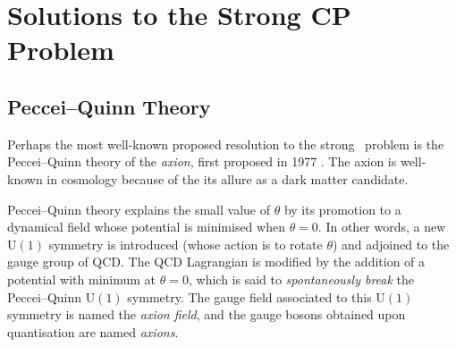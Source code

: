 \chapter{Solutions to the Strong CP Problem}

\section{Peccei--Quinn Theory}

Perhaps the most well-known proposed resolution to the strong \CP\ problem is the Peccei--Quinn theory of the \emph{axion}, first proposed in 1977 \cite{PecceiQuin_1977}.
The axion is well-known in cosmology because of the its allure as a dark matter candidate.

Peccei--Quinn theory explains the small value of $\theta$ by its promotion to a dynamical field whose potential is minimised when $\theta = 0$.
In other words, a new $\mathrm{U}(1)$ symmetry is introduced (whose action is to rotate $\theta$) and adjoined to the gauge group of QCD.
The QCD Lagrangian is modified by the addition of a potential with minimum at $\theta = 0$, which is said to \emph{spontaneously break} the Peccei--Quinn $\mathrm{U}(1)$ symmetry.
The gauge field associated to this $\mathrm{U}(1)$ symmetry is named the \emph{axion field}, and the gauge bosons obtained upon quantisation are named \emph{axions}.

